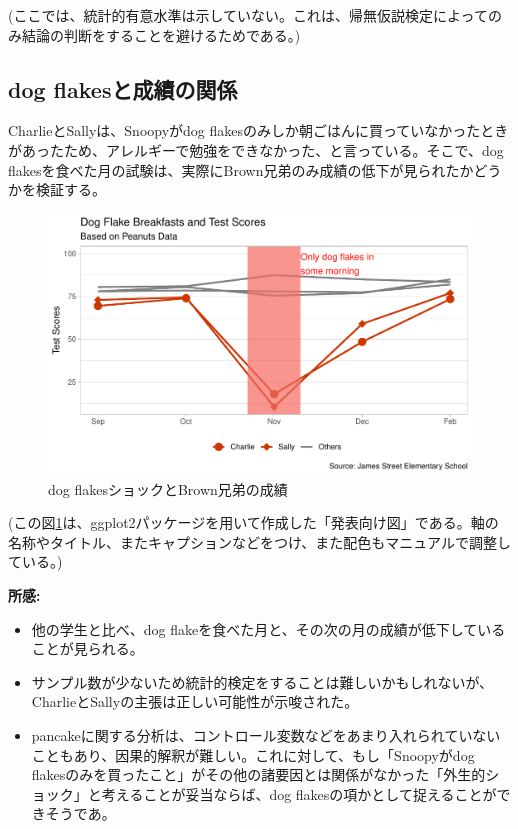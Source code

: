 \documentclass[xelatex,ja=standard]{bxjsarticle}
\begin{document}
(ここでは、統計的有意水準は示していない。これは、帰無仮説検定によってのみ結論の判断をすることを避けるためである。)

\subsection{dog flakesと成績の関係}

CharlieとSallyは、Snoopyがdog flakesのみしか朝ごはんに買っていなかったときがあったため、アレルギーで勉強をできなかった、と言っている。そこで、dog flakesを食べた月の試験は、実際にBrown兄弟のみ成績の低下が見られたかどうかを検証する。

\begin{figure}[h!]
\centering
\includegraphics[width=12cm]{04_analyze/dog_flakes_study/figure/dog_flakes_study.pdf}
\caption{dog flakesショックとBrown兄弟の成績}
\label{fig:img2}
\end{figure}

(この図\ref{fig:img2}は、ggplot2パッケージを用いて作成した「発表向け図」である。軸の名称やタイトル、またキャプションなどをつけ、また配色もマニュアルで調整している。)

\textbf{所感:}
\begin{itemize}
\item 他の学生と比べ、dog flakeを食べた月と、その次の月の成績が低下していることが見られる。
\item サンプル数が少ないため統計的検定をすることは難しいかもしれないが、CharlieとSallyの主張は正しい可能性が示唆された。
\item pancakeに関する分析は、コントロール変数などをあまり入れられていないこともあり、因果的解釈が難しい。これに対して、もし「Snoopyがdog flakesのみを買ったこと」がその他の諸要因とは関係がなかった「外生的ショック」と考えることが妥当ならば、dog flakesの項かとして捉えることができそうであ。

\end{itemize}

\newpage

 

%

%
%
\end{document}
